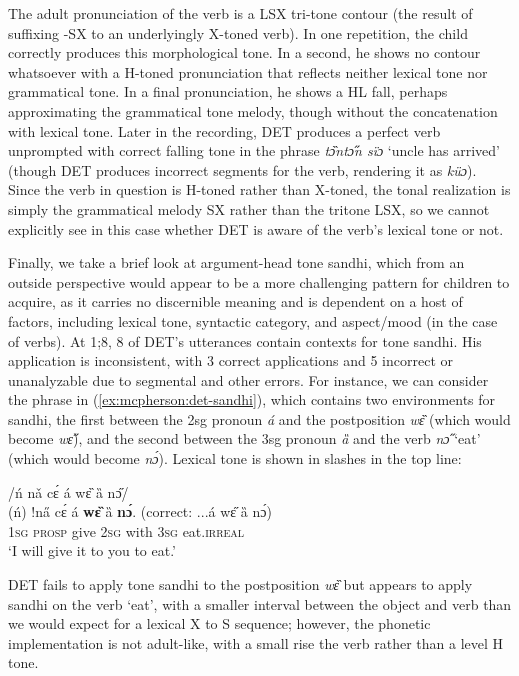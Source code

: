 \documentclass[output=paper,colorlinks,citecolor=brown,
]{langscibook}
\begin{document}
\z

The adult pronunciation of the verb is a LSX tri-tone contour (the result of suffixing -SX to an underlyingly X-toned verb). In one repetition, the child correctly produces this morphological tone. In a second, he shows no contour whatsoever with a H-toned pronunciation that reflects neither lexical tone nor grammatical tone. In a final pronunciation, he shows a HL fall, perhaps approximating the grammatical tone melody, though without the concatenation with lexical tone. Later in the recording, DET produces a perfect verb unprompted with correct falling tone in the phrase \textit{tɔ̏ntɔ̋n sïɔ} `uncle has arrived' (though DET produces incorrect segments for the verb, rendering it as \textit{küɔ}). Since the verb in question is H-toned rather than X-toned, the tonal realization is simply the grammatical melody SX rather than the tritone LSX, so we cannot explicitly see in this case whether DET is aware of the verb's lexical tone or not. 

Finally, we take a brief look at argument-head tone sandhi, which from an outside perspective would appear to be a more challenging pattern for children to acquire, as it carries no discernible meaning and is dependent on a host of factors, including lexical tone, syntactic category, and aspect/mood (in the case of verbs). At 1;8, 8 of DET's utterances contain contexts for tone sandhi. His application is inconsistent, with 3 correct applications and 5 incorrect or unanalyzable due to segmental and other errors. For instance, we can consider the phrase in (\ref{ex:mcpherson:det-sandhi}), which contains two environments for sandhi, the first between the 2sg pronoun \textit{á} and the postposition \textit{wɛ̏} (which would become \textit{wɛ̋}), and the second between the 3sg pronoun \textit{ȁ} and the verb \textit{nɔ̋} `eat' (which would become \textit{nɔ́}). Lexical tone is shown in slashes in the top line:

\ea\label{ex:mcpherson:det-sandhi} 
\glll /ń nǎ cɛ́ á wɛ̏ ȁ nɔ̋/ \\
(ń) !na̋ cɛ́ á \ast \textbf{wɛ̏} ȁ \textbf{nɔ́}. (correct: ...á wɛ̋ ȁ nɔ́) \\
\textsc{1sg} \textsc{prosp} give \textsc{2sg} with \textsc{3sg} eat.\textsc{irreal} \\
\glt `I will give it to you to eat.' \\

\z

\noindent DET fails to apply tone sandhi to the postposition \textit{wɛ̏} but appears to apply sandhi on the verb `eat', with a smaller interval between the object and verb than we would expect for a lexical X to S sequence; however, the phonetic implementation is not adult-like, with a small rise the verb rather than a level H tone. 
\end{document}
